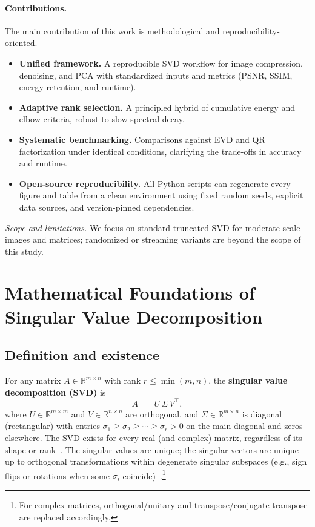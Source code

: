 \documentclass[11pt,a4paper]{article}
\begin{document}
\paragraph{Contributions.}
The main contribution of this work is methodological and reproducibility-oriented.
\begin{itemize}[leftmargin=*,noitemsep,topsep=0pt]
  \item \textbf{Unified framework.} A reproducible SVD workflow for image compression, denoising, and PCA with standardized inputs and metrics (PSNR, SSIM, energy retention, and runtime).
  \item \textbf{Adaptive rank selection.} A principled hybrid of cumulative energy and elbow criteria, robust to slow spectral decay.
  \item \textbf{Systematic benchmarking.} Comparisons against EVD and QR factorization under identical conditions, clarifying the trade-offs in accuracy and runtime.
  \item \textbf{Open-source reproducibility.}
All Python scripts can regenerate every figure and table from a clean environment using fixed random seeds, explicit data sources, and version-pinned dependencies.

\end{itemize}

\textit{Scope and limitations.} We focus on standard truncated SVD for moderate-scale images and matrices; randomized or streaming variants are beyond the scope of this study.

\section{Mathematical Foundations of Singular Value Decomposition}
\label{sec:math-foundations}

\subsection{Definition and existence}
For any matrix \(A \in \mathbb{R}^{m \times n}\) with rank \(r \le \min(m,n)\), the \textbf{singular value decomposition (SVD)} is
\[
A \;=\; U \,\Sigma\, V^\top,
\]
where \(U \in \mathbb{R}^{m \times m}\) and \(V \in \mathbb{R}^{n \times n}\) are orthogonal, and
\(\Sigma \in \mathbb{R}^{m \times n}\) is diagonal (rectangular) with entries
\(\sigma_1 \ge \sigma_2 \ge \cdots \ge \sigma_r > 0\) on the main diagonal and zeros elsewhere. 
The SVD exists for every real (and complex) matrix, regardless of its shape or rank~\cite{golub2013matrix,trefethen1997numerical}. 
The singular values are unique; the singular vectors are unique up to orthogonal transformations within degenerate singular subspaces (e.g., sign flips or rotations when some \(\sigma_i\) coincide)~\cite{horn2012matrix}.\footnote{For complex matrices, orthogonal/unitary and transpose/conjugate-transpose are replaced accordingly.}
\end{document}
